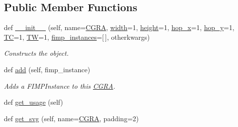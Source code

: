 \subsection*{Public Member Functions}
\begin{DoxyCompactItemize}
\item 
def \hyperlink{classsylva_1_1base_1_1cgra_1_1_c_g_r_a_a688cf81ea7c4ca525407bde916e47449}{\+\_\+\+\_\+init\+\_\+\+\_\+} (self, name=\textquotesingle{}\hyperlink{classsylva_1_1base_1_1cgra_1_1_c_g_r_a}{C\+G\+RA}\textquotesingle{}, \hyperlink{classsylva_1_1base_1_1cgra_1_1_c_g_r_a_a303858bc048fcc89e1b223bc6b9082bd}{width}=1, \hyperlink{classsylva_1_1base_1_1cgra_1_1_c_g_r_a_ab60b2034fe9b4e7ec4495734e7e539ff}{height}=1, \hyperlink{classsylva_1_1base_1_1cgra_1_1_c_g_r_a_ae67d495bb4c25fad719b784050791deb}{hop\+\_\+x}=1, \hyperlink{classsylva_1_1base_1_1cgra_1_1_c_g_r_a_acefbfbffe5662d0ffe67edc5e8ab2dc5}{hop\+\_\+y}=1, \hyperlink{classsylva_1_1base_1_1cgra_1_1_c_g_r_a_aaf504ff22d9654086c2aa987e382f49e}{TC}=1, \hyperlink{classsylva_1_1base_1_1cgra_1_1_c_g_r_a_a0bab5c20e9d084928b52b87d875f838b}{TW}=1, \hyperlink{classsylva_1_1base_1_1cgra_1_1_c_g_r_a_a9c917482a404c44bfe983498adaefe2b}{fimp\+\_\+instances}=\mbox{[}$\,$\mbox{]}, otherkwargs)
\begin{DoxyCompactList}\small\item\em Constructs the object. \end{DoxyCompactList}\item 
def \hyperlink{classsylva_1_1base_1_1cgra_1_1_c_g_r_a_ab65c404b8ababe6e0f65664058865c60}{add} (self, fimp\+\_\+instance)
\begin{DoxyCompactList}\small\item\em Adds a F\+I\+M\+P\+Instance to this \hyperlink{classsylva_1_1base_1_1cgra_1_1_c_g_r_a}{C\+G\+RA}. \end{DoxyCompactList}\item 
def \hyperlink{classsylva_1_1base_1_1cgra_1_1_c_g_r_a_a893cfb7c3fed9ebfb0187693eb132e2f}{get\+\_\+usage} (self)
\item 
def \hyperlink{classsylva_1_1base_1_1cgra_1_1_c_g_r_a_a3dbb09fffa43dca0e05704337f93662d}{get\+\_\+svg} (self, name=\textquotesingle{}\hyperlink{classsylva_1_1base_1_1cgra_1_1_c_g_r_a}{C\+G\+RA}\textquotesingle{}, padding=2)
\end{DoxyCompactItemize}
